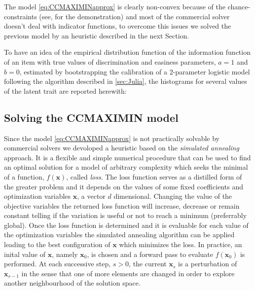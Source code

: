 The model \eqref{eq:CCMAXIMINapprox} is clearly non-convex because of the chance-constraints (see, \textcite{rockafellar2000optimization,rockafellar2001uryasev} for the demonstration) and most of the commercial solver doesn't deal with indicator functions, to overcome this issues we solved the previous model by an heuristic described in the next Section.

To have an idea of the empirical distribution function of the information function of an item with true values of discrimination and easiness parameters, $a=1$ and $b=0$, estimated by bootstrapping the calibration of a 2-parameter logistic model following the algorithm described in \ref{sec:Julia}, the histograms for several values of the latent trait are reported herewith:

 


\color{black}
\subsection{Solving the CCMAXIMIN model}\label{sec:heur}
Since the model \eqref{eq:CCMAXIMINapprox} is not practically solvable by commercial solvers we devoloped a heuristic based on the \emph{simulated annealing} approach. It is a flexible and simple numerical procedure that can be used to find an optimal solution for a model of arbitrary complexity which seeks the minimal of a function, $f(\mathbf{x})$, called \emph{loss}. The loss function serves as a distilled form of the greater problem and it depends on the values of some fixed coefficients and optimization variables $\mathbf{x}$, a vector $d$ dimensional. Changing the value of the objective variables the returned loss function will increase, decrease or remain constant telling if the variation is useful or not to reach a minimum (preferrably global). Once the loss function is determined and it is evaluable for each value of the optimization variables the simulated annealing algorithm can be applied leading to the best configuration of $\mathbf{x}$ which minimizes the loss. In practice, an inital value of $\mathbf{x}$, namely $\mathbf{x}_0$, is chosen and a forward pass to evaluate $f(\mathbf{x}_0)$ is performed. At each successive step, $s>0$, the current $\mathbf{x}_s$ is a perturbation of $\mathbf{x}_{s-1}$ in the sense that one of more elements are changed in order to explore another neighbourhood of the solution space.

